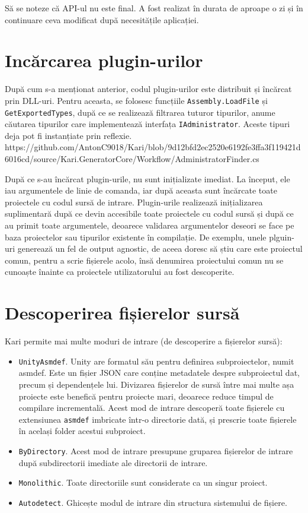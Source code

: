 \documentclass[a4paper,12pt]{report}
\begin{document}
Să se noteze că \ac{API}-ul nu este final.
A fost realizat în durata de aproape o zi și în continuare ceva modificat după necesitățile aplicației.


\section{Incărcarea plugin-urilor}

După cum s-a menționat anterior, codul plugin-urilor este distribuit și încărcat prin \ac{DLL}-uri.
Pentru aceasta, se folosesc funcțiile \texttt{Assembly.LoadFile} și \texttt{GetExportedTypes}, după ce se realizează filtrarea tuturor tipurilor, anume căutarea tipurilor care implementează interfața \texttt{IAdministrator}.
Aceste tipuri deja pot fi instanțiate prin reflexie.
https://github.com/AntonC9018/Kari/blob/9d12bfd2ec2520e6192fe3ffa3f119421d6016cd/source/Kari.GeneratorCore/Workflow/AdministratorFinder.cs

După ce s-au încărcat plugin-urile, nu sunt inițializate imediat.
La început, ele iau argumentele de linie de comanda, iar după aceasta sunt încărcate toate proiectele cu codul sursă de intrare.
Plugin-urile realizează inițializarea suplimentară după ce devin accesibile toate proiectele cu codul sursă și după ce au primit toate argumentele, deoarece validarea argumentelor deseori se face pe baza proiectelor sau tipurilor existente în compilație.
De exemplu, unele plguin-uri generează un fel de output agnostic, de aceea doresc să știu care este proiectul comun, pentru a scrie fișierele acolo, însă denumirea proiectului comun nu se cunoaște înainte ca proiectele utilizatorului au fost descoperite.

\section{Descoperirea fișierelor sursă}

Kari permite mai multe moduri de intrare (de descoperire a fișierelor sursă):

\begin{itemize}
  \item \texttt{UnityAsmdef}.
    Unity are formatul său pentru definirea subproiectelor, numit asmdef.
    Este un fișier JSON care conține metadatele despre subproiectul dat, precum și dependențele lui.
    Divizarea fișierelor de sursă între mai multe așa proiecte este benefică pentru proiecte mari, deoarece reduce timpul de compilare incrementală.
    Acest mod de intrare descoperă toate fișierele cu extensiunea \texttt{asmdef} imbricate într-o directorie dată, și prescrie toate fișierele în același folder acestui subproiect.

  \item \texttt{ByDirectory}. Acest mod de intrare presupune gruparea fișierelor de intrare după subdirectorii imediate ale directorii de intrare.

  \item \texttt{Monolithic}. Toate directoriile sunt considerate ca un singur proiect.

  \item \texttt{Autodetect}. Ghicește modul de intrare din structura sistemului de fișiere.
\end{itemize}
\end{document}
